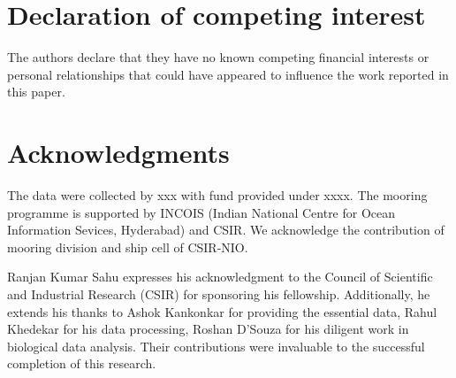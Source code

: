 \documentclass{article}
\begin{document}
	\section{Declaration of competing interest}
	The authors declare that they have no known competing financial interests or personal
	relationships that could have appeared to influence the work reported in this paper.
	
	\section{Acknowledgments} 
	The data were collected by xxx with fund provided under xxxx. The mooring programme is supported by INCOIS (Indian National Centre for Ocean Information Sevices, Hyderabad) and CSIR. We acknowledge the contribution of mooring division and ship cell of CSIR-NIO. 
	
	Ranjan Kumar Sahu expresses his acknowledgment to the Council of Scientific and Industrial Research (CSIR) for sponsoring his fellowship. Additionally, he extends his thanks to Ashok Kankonkar for providing the essential data, Rahul Khedekar for his data processing, Roshan D'Souza for his diligent work in biological data analysis. Their contributions were invaluable to the successful completion of this research.


\linespread{1.5}	
{\footnotesize 	 %
}	

\newpage
{} 
\end{document}
